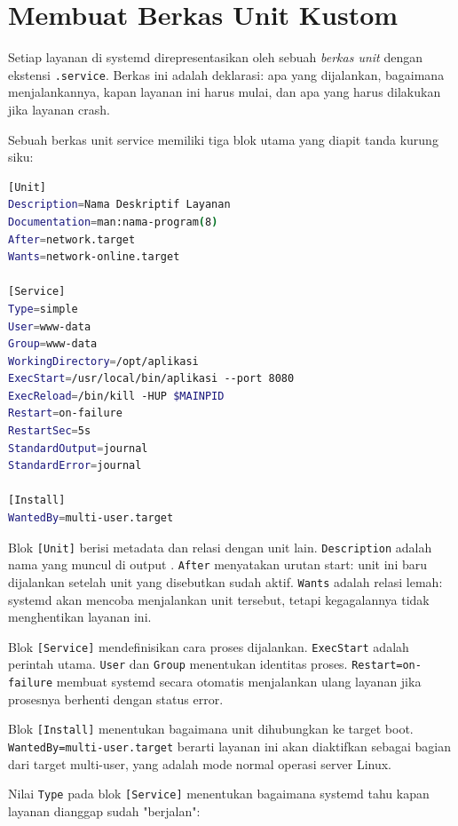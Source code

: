 \section{Membuat Berkas Unit Kustom}
\label{sec:unit-files}

Setiap layanan di systemd direpresentasikan oleh sebuah \textit{berkas unit} dengan ekstensi \texttt{.service}. Berkas ini adalah deklarasi: apa yang dijalankan, bagaimana menjalankannya, kapan layanan ini harus mulai, dan apa yang harus dilakukan jika layanan crash.

Sebuah berkas unit service memiliki tiga blok utama yang diapit tanda kurung siku:

\begin{lstlisting}[language=bash, caption={Struktur berkas unit .service}]
[Unit]
Description=Nama Deskriptif Layanan
Documentation=man:nama-program(8)
After=network.target
Wants=network-online.target

[Service]
Type=simple
User=www-data
Group=www-data
WorkingDirectory=/opt/aplikasi
ExecStart=/usr/local/bin/aplikasi --port 8080
ExecReload=/bin/kill -HUP $MAINPID
Restart=on-failure
RestartSec=5s
StandardOutput=journal
StandardError=journal

[Install]
WantedBy=multi-user.target
\end{lstlisting}

Blok \texttt{[Unit]} berisi metadata dan relasi dengan unit lain. \texttt{Description} adalah nama yang muncul di output . \texttt{After} menyatakan urutan start: unit ini baru dijalankan setelah unit yang disebutkan sudah aktif. \texttt{Wants} adalah relasi lemah: systemd akan mencoba menjalankan unit tersebut, tetapi kegagalannya tidak menghentikan layanan ini.

Blok \texttt{[Service]} mendefinisikan cara proses dijalankan. \texttt{ExecStart} adalah perintah utama. \texttt{User} dan \texttt{Group} menentukan identitas proses. \texttt{Restart=on-failure} membuat systemd secara otomatis menjalankan ulang layanan jika prosesnya berhenti dengan status error.

Blok \texttt{[Install]} menentukan bagaimana unit dihubungkan ke target boot. \texttt{WantedBy=multi-user.target} berarti layanan ini akan diaktifkan sebagai bagian dari target multi-user, yang adalah mode normal operasi server Linux.

Nilai \texttt{Type} pada blok \texttt{[Service]} menentukan bagaimana systemd tahu kapan layanan dianggap sudah "berjalan":

